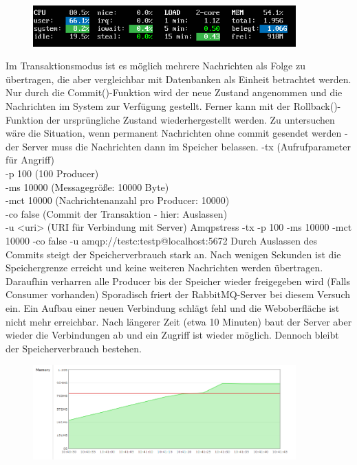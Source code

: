 \documentclass[	a4paper,
			11pt,
			titlepage,
			oneside,
			fleqn,
			listof=totoc,
			parskip,
			chapterprefix=false,
			numbers=noenddot]{scrartcl}
\begin{document}
\begin{figure}[H]
	\vspace{0.5cm}
	\centering
	\includegraphics[width=0.9\textwidth]{img/channel/100con100ms}
\end{figure}

\clearpage
		{Im Transaktionsmodus ist es möglich mehrere Nachrichten als Folge zu übertragen, die aber vergleichbar mit Datenbanken als Einheit betrachtet werden. Nur durch die Commit()-Funktion wird der neue Zustand angenommen und die Nachrichten im System zur Verfügung gestellt. Ferner kann mit der Rollback()-Funktion der ursprüngliche Zustand wiederhergestellt werden. Zu untersuchen wäre die Situation, wenn permanent Nachrichten ohne commit gesendet werden - der Server muss die Nachrichten dann im Speicher belassen. }%
		{%
		 -tx (Aufrufparameter für Angriff) \\
		 -p 100 (100 Producer) \\
		 -ms 10000 (Messagegröße: 10000 Byte) \\
		 -mct 10000 (Nachrichtenanzahl pro Producer: 10000) \\
		 -co false (Commit der Transaktion - hier: Auslassen) \\
		 -u <uri> (URI für Verbindung mit Server)
		}%
		{Amqpstress -tx -p 100 -ms 10000 -mct 10000 -co false -u amqp://testc:testp@localhost:5672}%
		{Durch Auslassen des Commits steigt der Speicherverbrauch stark an. Nach wenigen Sekunden ist die Speichergrenze erreicht und keine weiteren Nachrichten werden übertragen. Daraufhin verharren alle Producer bis der Speicher wieder freigegeben wird (Falls Consumer vorhanden) }
		{Sporadisch friert der RabbitMQ-Server bei diesem Versuch ein. Ein Aufbau einer neuen Verbindung schlägt fehl und die Weboberfläche ist nicht mehr erreichbar. Nach längerer Zeit (etwa 10 Minuten) baut der Server aber wieder die Verbindungen ab und ein Zugriff ist wieder möglich. Dennoch bleibt der Speicherverbrauch bestehen.}

\begin{figure}[H]
	\vspace{0.5cm}
	\centering
	\includegraphics[width=0.9\textwidth]{img/commit/noCommit100p}
\end{figure}
\end{document}
